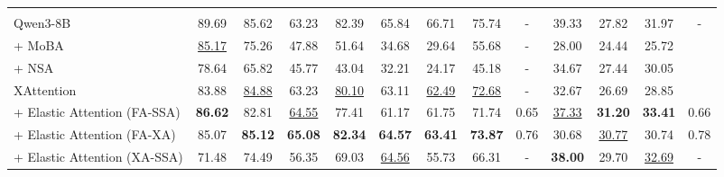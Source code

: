 \begin{table}[t]
{\begin{tabular}{l | c c c c c c | c | c | c c | c | c}
\arrayrulecolor{black}\midrule
\rowcolor{blue!25}
\multicolumn{13}{c}{\textbf{Qwen3-8B 骨干模型}} \\
\arrayrulecolor{black!20}\midrule
Qwen3-8B & 89.69 & 85.62 & 63.23 & 82.39 & 65.84 & 66.71 & 75.74 & - & 39.33 & 27.82 & 31.97 & - \\
+ MoBA & \underline{85.17} & 75.26 & 47.88 & 51.64 & 34.68 & 29.64 & 55.68& - & 28.00 & 24.44 & 25.72 \\
+ NSA & 78.64 & 65.82 & 45.77 & 43.04 & 32.21 & 24.17 & 45.18 &-& 34.67 & 27.44 & 30.05 \\
XAttention & 83.88 & \underline{84.88} & 63.23 & \underline{80.10} & 63.11 & \underline{62.49} & \underline{72.68} & - & 32.67 & 26.69 & 28.85 \\
\arrayrulecolor{black!40}\midrule
+ Elastic Attention (FA-SSA) & \textbf{86.62} & 82.81 & \underline{64.55} & 77.41 & 61.17 & 61.75 & 71.74 & 0.65 & \underline{37.33} & \textbf{31.20} & \textbf{33.41}  & 0.66\\
+ Elastic Attention (FA-XA) & 85.07 & \textbf{85.12} & \textbf{65.08} & \textbf{82.34} & \textbf{64.57} & \textbf{63.41} & \textbf{73.87} & 0.76 & 30.68 & \underline{30.77} & 30.74 & 0.78\\
+ Elastic Attention (XA-SSA) & 71.48 & 74.49 & 56.35 & 69.03 & \underline{64.56} & 55.73 & 66.31 & - & \textbf{38.00} & 29.70 & \underline{32.69} & -\\


\end{tabular}}
\end{table}
